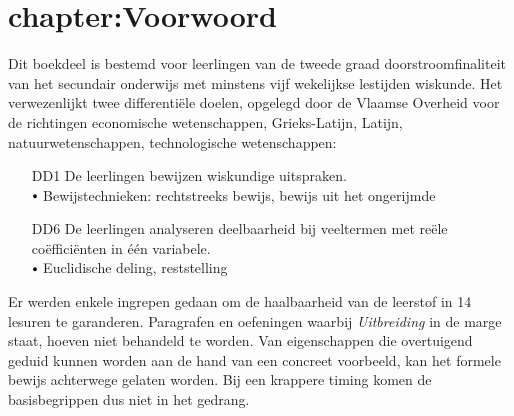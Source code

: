 \documentclass{ximera}
\begin{document}


















\section{chapter:Voorwoord}

Dit boekdeel is bestemd voor leerlingen van de tweede graad doorstroomfinaliteit van het secundair onderwijs met minstens vijf wekelijkse lestijden wiskunde. Het verwezenlijkt twee differenti\"ele doelen, opgelegd door de Vlaamse Overheid voor de richtingen economische wetenschappen, Grieks-Latijn, Latijn, natuurwetenschappen, technologische wetenschappen:
\begin{center}
\begin{minipage}{13cm}\itshape
\begin{enumerate}
\item[DD1]
De leerlingen bewijzen wiskundige uitspraken. \\
$\sbullet[.75]$ Bewijstechnieken: rechtstreeks bewijs, bewijs uit het ongerijmde
\item[DD6]
De leerlingen analyseren deelbaarheid bij veeltermen met re\"ele co\"efficiënten in \'e\'en variabele. \\
$\sbullet[.75]$ Euclidische deling, reststelling
\end{enumerate}
\end{minipage}
\end{center}


 
Er werden enkele ingrepen gedaan om de haalbaarheid van de leerstof in 14 lesuren te garanderen. Paragrafen en oefeningen waarbij \textit{Uitbreiding} in de marge staat, hoeven niet behandeld te worden. Van eigenschappen die overtuigend geduid kunnen worden aan de hand van een concreet voorbeeld, kan het formele bewijs achterwege gelaten worden. Bij een krappere timing komen de basisbegrippen dus niet in het gedrang.
\end{document}
